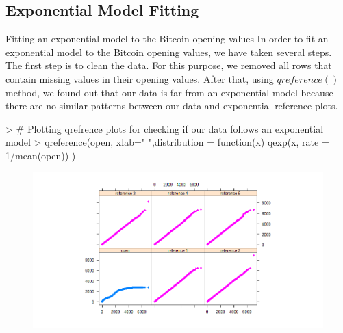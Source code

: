 \documentclass{article}
\begin{document}
\subsection{Exponential Model Fitting}
Fitting an exponential model to the Bitcoin opening values
In order to fit an exponential model to the Bitcoin opening values, we have taken several steps. The first step is to clean the data. For this purpose, we removed all rows that contain missing values in their opening values. After that, using $qreference()$ method, we found out that our data is far from an exponential model because there are no similar patterns between our data and exponential reference plots.
\begin{Schunk}
\end{Schunk}
\begin{Schunk}
\begin{Sinput}
> # Plotting qrefrence plots for checking if our data follows an exponential model
> qreference(open, xlab=" ",distribution = function(x) qexp(x, rate = 1/mean(open)) )
\end{Sinput}
\end{Schunk}
\newpage
\begin{figure}[H]
\includegraphics[width=1.1\textwidth]{qqref.png}
\end{figure}
\end{document}
